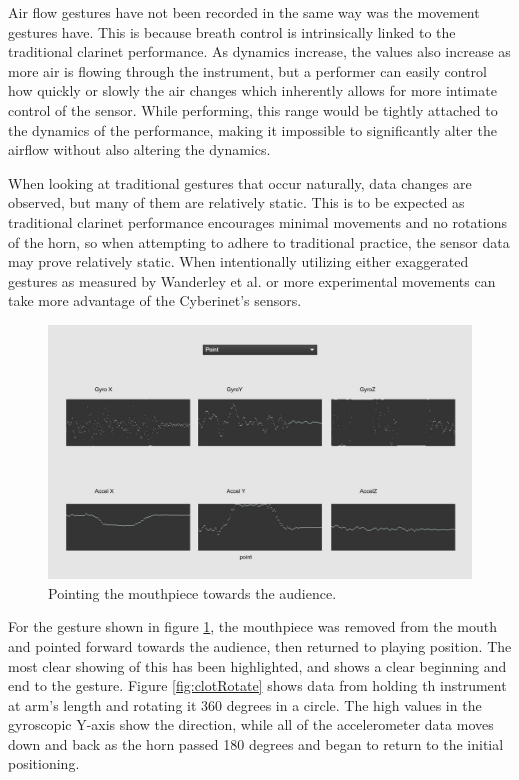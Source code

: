 Air flow gestures have not been recorded in the same way was the movement gestures have. This is because breath control is intrinsically linked to the traditional clarinet performance. As dynamics increase, the values also increase as more air is flowing through the instrument, but a performer can easily control how quickly or slowly the air changes which inherently allows for more intimate control of the sensor. While performing, this range would be tightly attached to the dynamics of the performance, making it impossible to significantly alter the airflow without also altering the dynamics.



 When looking at traditional gestures that occur naturally\cite{wanderleyClarinetGesture2005}, data changes are observed, but many of them are relatively static. This is to be expected as traditional clarinet performance encourages minimal movements and no rotations of the horn, so when attempting to adhere to traditional practice, the sensor data may prove relatively static. When intentionally utilizing either exaggerated gestures as measured by Wanderley et al. or more experimental movements can take more advantage of the Cyberinet's sensors.

\begin{figure}
    \centering
    \includegraphics[scale=0.2]{diagrams/gestureData/pointing.png}
    \caption{Pointing the mouthpiece towards the audience.}
    \label{fig:pointData}
\end{figure}

For the gesture shown in figure \ref{fig:pointData}, the mouthpiece was removed from the mouth and pointed forward towards the audience, then returned to playing position. The most clear showing of this has been highlighted, and shows a clear beginning and end to the gesture. Figure \ref{fig:clotRotate} shows data from holding th instrument at arm's length and rotating it 360 degrees in a circle. The high values in the gyroscopic Y-axis show the direction, while all of the accelerometer data moves down and back as the horn passed 180 degrees and began to return to the initial positioning.

